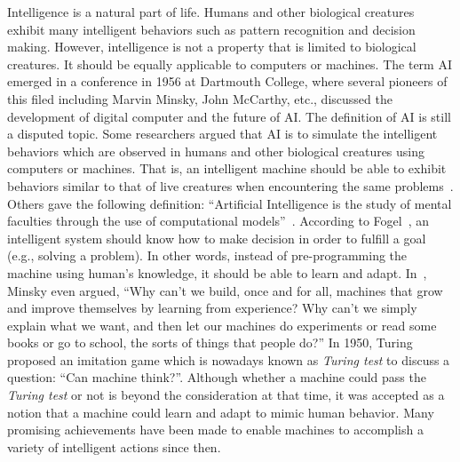Intelligence is a natural part of life. Humans and other biological creatures exhibit many intelligent behaviors such as pattern recognition and decision making. However, intelligence is not a property that is limited to biological creatures. It should be equally applicable to computers or machines. The term AI emerged in a conference in 1956 at Dartmouth College, where several pioneers of this filed including Marvin Minsky, John McCarthy, etc., discussed the development of digital computer and the future of AI. The definition of AI is still a disputed topic.  Some researchers argued that AI is to simulate the intelligent behaviors which are observed in humans and other biological creatures using computers or machines. That is, an intelligent machine should be able to exhibit behaviors similar to that of live creatures when encountering the same problems~\cite{Schildt1985}. Others gave the following definition: ``Artificial Intelligence is the study of mental faculties through the use of computational models''~\cite{Charniak1985}. According to Fogel~\cite{Fogel1995}, an intelligent system should know how to make decision in order to fulfill a goal (e.g., solving a problem). In other words, instead of pre-programming the machine using human's knowledge, it should be able to learn and adapt. In~\cite{Minsky_1991}, Minsky even argued, ``Why can't we build, once and for all, machines that grow and improve themselves by learning from experience? Why can't we simply explain what we want, and then let our machines do experiments or read some books or go to school, the sorts of things that people do?'' In 1950, Turing~\cite{Turing_1950} proposed an imitation game which is nowadays known as \textit{Turing test} to discuss a question: ``Can machine think?''. Although whether a machine could pass the \textit{Turing test} or not is beyond the consideration at that time, it was accepted as a notion that a machine could learn and adapt to mimic human behavior. Many promising achievements have been made to enable machines to accomplish a variety of intelligent actions since then. 

